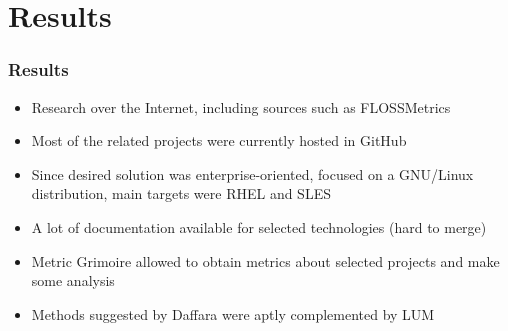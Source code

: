 \section{Results}

\begin{frame}
\frametitle{Results}

\begin{itemize}
  \item Research over the Internet, including sources such as FLOSSMetrics
  \item Most of the related projects were currently hosted in GitHub
  \item Since desired solution was enterprise-oriented, focused on a GNU/Linux distribution, main targets were RHEL and SLES
  \item A lot of documentation available for selected technologies (hard to merge)
  \item Metric Grimoire allowed to obtain metrics about selected projects and make some analysis
  \item Methods suggested by Daffara were aptly complemented by LUM
\end{itemize}

\end{frame}
